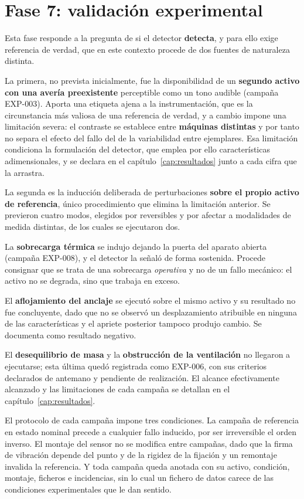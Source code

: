 \section{Fase 7: validación experimental}

Esta fase responde a la pregunta de si el detector \textbf{detecta}, y para ello exige referencia
de verdad, que en este contexto procede de dos fuentes de naturaleza distinta.

La primera, no prevista inicialmente, fue la disponibilidad de un \textbf{segundo activo con una
avería preexistente} perceptible como un tono audible (campaña EXP-003). Aporta una etiqueta ajena a la instrumentación, que
es la circunstancia más valiosa de una referencia de verdad, y a cambio impone una limitación
severa: el contraste se establece entre \textbf{máquinas distintas} y por tanto no separa el
efecto del fallo del de la variabilidad entre ejemplares. Esa limitación condiciona la
formulación del detector, que emplea por ello características adimensionales, y se declara en el
capítulo~\ref{cap:resultados} junto a cada cifra que la arrastra.

La segunda es la inducción deliberada de perturbaciones \textbf{sobre el propio activo de
referencia}, único procedimiento que elimina la limitación anterior. Se previeron cuatro modos,
elegidos por reversibles y por afectar a modalidades de medida distintas, de los cuales se
ejecutaron dos.

La \textbf{sobrecarga térmica} se indujo dejando la puerta del aparato abierta (campaña EXP-008),
y el detector la señaló de forma sostenida. Procede consignar que se trata de una sobrecarga \textit{operativa} y
no de un fallo mecánico: el activo no se degrada, sino que trabaja en exceso.

El \textbf{aflojamiento del anclaje} se ejecutó sobre el mismo activo y su resultado no fue
concluyente, dado que no se observó un desplazamiento atribuible en ninguna de las
características y el apriete posterior tampoco produjo cambio. Se documenta como resultado
negativo.

El \textbf{desequilibrio de masa} y la \textbf{obstrucción de la ventilación} no llegaron a
ejecutarse; esta última quedó registrada como EXP-006, con sus criterios declarados de antemano y
pendiente de realización. El alcance efectivamente alcanzado y las limitaciones de cada campaña se detallan
en el capítulo~\ref{cap:resultados}.

El protocolo de cada campaña impone tres condiciones. La campaña de referencia en estado nominal
precede a cualquier fallo inducido, por ser irreversible el orden inverso. El montaje del sensor
no se modifica entre campañas, dado que la firma de vibración depende del punto y de la rigidez
de la fijación y un remontaje invalida la referencia. Y toda campaña queda anotada con su activo,
condición, montaje, ficheros e incidencias, sin lo cual un fichero de datos carece de las
condiciones experimentales que le dan sentido.

